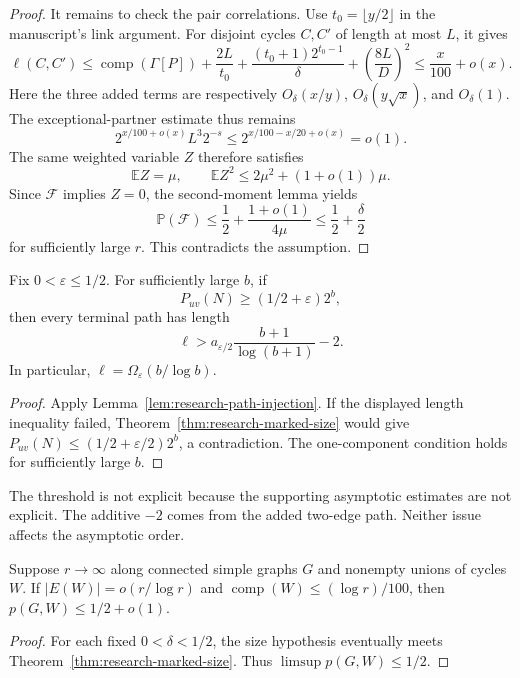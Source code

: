 \begin{proof}
It remains to check the pair correlations.
Use $t_0=\lfloor y/2\rfloor$ in the manuscript's link argument.
For disjoint cycles $C,C'$ of length at most $L$, it gives
\[
 \ell(C,C')\le \operatorname{comp}(\Gamma[P])
 +\frac{2L}{t_0}
 +\frac{(t_0+1)2^{t_0-1}}{\delta}
 +\left(\frac{8L}{D}\right)^2
 \le\frac{x}{100}+o(x).
\]
Here the three added terms are respectively $O_\delta(x/y)$, $O_\delta(y\sqrt{x})$, and $O_\delta(1)$.
The exceptional-partner estimate thus remains
\[
 2^{x/100+o(x)}L^3 2^{-s}
 \le2^{x/100-x/20+o(x)}=o(1).
\]
The same weighted variable $Z$ therefore satisfies
\[
 \mathbb EZ=\mu,\qquad
 \mathbb EZ^2\le2\mu^2+(1+o(1))\mu.
\]
Since $\mathcal F$ implies $Z=0$, the second-moment lemma yields
\[
 \mathbb P(\mathcal F)\le\frac12+\frac{1+o(1)}{4\mu}
 \le\frac12+\frac\delta2
\]
for sufficiently large $r$.
This contradicts the assumption.
\end{proof}

\begin{corollary}\label{cor:research-general-path}
Fix $0<\varepsilon\le1/2$.
For sufficiently large $b$, if
\[
 P_{uv}(N)\ge(1/2+\varepsilon)2^b,
\]
then every terminal path has length
\[
 \ell>a_{\varepsilon/2}\frac{b+1}{\log(b+1)}-2.
\]
In particular, $\ell=\Omega_\varepsilon(b/\log b)$.
\end{corollary}

\begin{proof}
Apply Lemma~\ref{lem:research-path-injection}.
If the displayed length inequality failed, Theorem~\ref{thm:research-marked-size} would give
$P_{uv}(N)\le(1/2+\varepsilon/2)2^b$, a contradiction.
The one-component condition holds for sufficiently large $b$.
\end{proof}

The threshold is not explicit because the supporting asymptotic estimates are not explicit.
The additive $-2$ comes from the added two-edge path.
Neither issue affects the asymptotic order.

\begin{corollary}\label{cor:research-small-marked}
Suppose $r\to\infty$ along connected simple graphs $G$ and nonempty unions of cycles $W$.
If $|E(W)|=o(r/\log r)$ and $\operatorname{comp}(W)\le(\log r)/100$, then
$p(G,W)\le1/2+o(1)$.
\end{corollary}

\begin{proof}
For each fixed $0<\delta<1/2$, the size hypothesis eventually meets Theorem~\ref{thm:research-marked-size}.
Thus $\limsup p(G,W)\le1/2$.
\end{proof}

